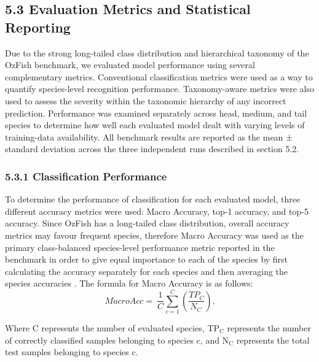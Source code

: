 \documentclass[preprint,12pt]{elsarticle}
\providecommand{\textsubscript}[1]{\ensuremath{_{\text{#1}}}}
\begin{document}
\subsection*{5.3 Evaluation Metrics and Statistical
Reporting}\label{evaluation-metrics-and-statistical-reporting}

Due to the strong long-tailed class distribution
\cite{ref15}
\cite{ref16} and hierarchical taxonomy
\cite{ref23}
\cite{ref24} of the OzFish benchmark, we
evaluated model performance using several complementary metrics.
Conventional classification metrics were used as a way to quantify
species-level recognition performance. Taxonomy-aware metrics were also
used to assess the severity within the taxonomic hierarchy of any
incorrect prediction. Performance was examined separately across head,
medium, and tail species to determine how well each evaluated model
dealt with varying levels of training-data availability. All benchmark
results are reported as the mean ± standard deviation across the three
independent runs described in section 5.2.

\subsubsection*{5.3.1 Classification
Performance}\label{classification-performance}

To determine the performance of classification for each evaluated model,
three different accuracy metrics were used: Macro Accuracy, top-1
accuracy, and top-5 accuracy. Since OzFish has a long-tailed class
distribution, overall accuracy metrics may favour frequent species,
therefore Macro Accuracy was used as the primary class-balanced
species-level performance metric reported in the benchmark in order to
give equal importance to each of the species by first calculating the
accuracy separately for each species and then averaging the species
accuracies \cite{ref16}
\cite{ref65}. The formula for Macro Accuracy is
as follows:\\
\begin{equation}
MacroAcc = \ \frac{1}{C}\sum_{c = 1}^{C}\left( \frac{{TP}_{C}}{N_{C\ }} \right)\text{,}
\end{equation}

Where C represents the number of evaluated species, TP\textsubscript{C}
represents the number of correctly classified samples belonging to
species c, and N\textsubscript{C} represents the total test samples
belonging to species c.
\end{document}
